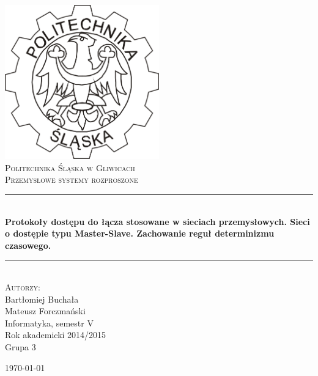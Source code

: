 \documentclass[a4paper,twoside]{article}
\newcommand{\HRule}{\rule{\linewidth}{0.5mm}}
\begin{document}
	
	\begin{titlepage}
		\begin{center}
			
			\includegraphics[width=0.5\textwidth]{./img/logo.png}~\\[1cm]
			
			\textsc{\LARGE Politechnika Śląska w Gliwicach}\\[1.5cm]
			
			\textsc{\Large Przemysłowe systemy rozproszone}\\[0.5cm]
			
			\HRule \\[0.4cm]
			{ \huge \bfseries Protokoły dostępu do łącza stosowane w sieciach przemysłowych. Sieci o dostępie typu Master-Slave. Zachowanie reguł determinizmu czasowego.  \\[0.4cm] }
			
			\HRule \\[1.5cm]
			
			\textsc{\Large Autorzy:} \\
			Bartłomiej Buchała \\
			Mateusz Forczmański \\
			[1.0cm]
			Informatyka, semestr V \\
			Rok akademicki 2014/2015 \\
			Grupa 3
			
			\vfill
			
			{\large \today}
			
		\end{center}
	\end{titlepage}
	
\newpage
\end{document}
